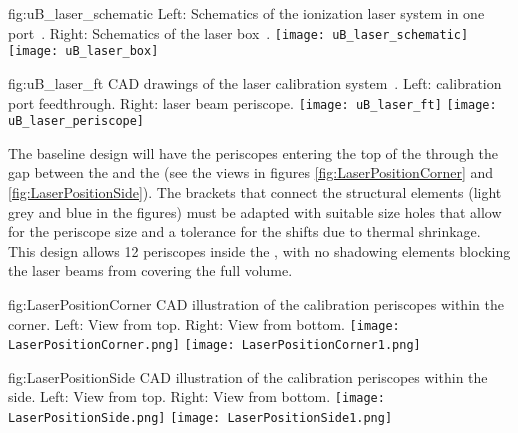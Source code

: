 \begin{dunefigure}{fig:uB_laser_schematic}
{Left: Schematics of the ionization laser system in one port~\cite{Antonello:2015lea}. Right: Schematics of the laser box~\cite{microboone}.}
\texttt{[image: uB\_laser\_schematic]}
\texttt{[image: uB\_laser\_box]}
\end{dunefigure}

\begin{dunefigure}{fig:uB_laser_ft}
{CAD drawings of the  laser calibration system~\cite{microboone}. Left: calibration port feedthrough. Right: laser beam periscope. %
}
\texttt{[image: uB\_laser\_ft]}
\texttt{[image: uB\_laser\_periscope]}
\end{dunefigure}

The baseline design will have the periscopes entering the top of the  through the gap %
between the  and the  (see the views in figures \ref{fig:LaserPositionCorner} and \ref{fig:LaserPositionSide}). The brackets that connect the  structural elements (light grey and blue in the figures) must be adapted with suitable size holes that allow for the periscope size and a tolerance for the shifts due to  thermal shrinkage. This design allows \num{12} periscopes inside the , with no shadowing elements blocking the laser beams from covering the full volume.

\begin{dunefigure}{fig:LaserPositionCorner}
{CAD illustration of the calibration periscopes within the    corner. Left: View from top. Right: View from bottom.}
\texttt{[image: LaserPositionCorner.png]}
\texttt{[image: LaserPositionCorner1.png]}
\end{dunefigure}

\begin{dunefigure}{fig:LaserPositionSide}
{CAD illustration of the calibration periscopes within the    side. 
Left: View from top. Right: View from bottom.}
\texttt{[image: LaserPositionSide.png]}
\texttt{[image: LaserPositionSide1.png]}
\end{dunefigure}


